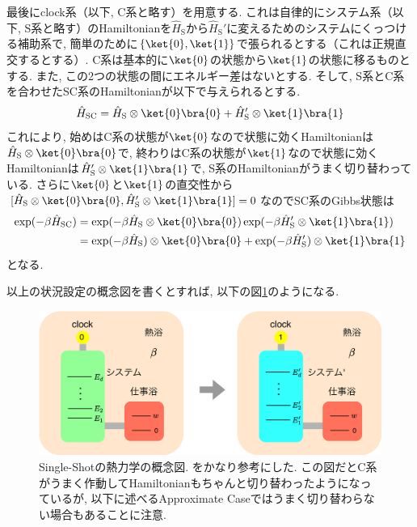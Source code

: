 最後にclock系（以下, C系と略す）を用意する. 
これは自律的にシステム系（以下, S系と略す）のHamiltonianを$\hat{H}_\text{S}$から$\hat{H}_\text{S}'$に変えるためのシステムにくっつける補助系で, 簡単のために$\{\ket{0}, \ket{1}\}$で張られるとする（これは正規直交するとする）. 
C系は基本的に$\ket{0}$の状態から$\ket{1}$の状態に移るものとする. 
また, この2つの状態の間にエネルギー差はないとする. 
そして, S系とC系を合わせたSC系のHamiltonianが以下で与えられるとする. 
\begin{equation}
  \hat{H}_{\text{SC}}=\hat{H}_{\text{S}}\otimes\ket{0}\bra{0}+\hat{H}_{\text{S}}'\otimes\ket{1}\bra{1}
\end{equation}
これにより, 始めはC系の状態が$\ket{0}$なので状態に効くHamiltonianは$\hat{H}_{\text{S}}\otimes\ket{0}\bra{0}$で, 終わりはC系の状態が$\ket{1}$なので状態に効くHamiltonianは$\hat{H}_{\text{S}}'\otimes\ket{1}\bra{1}$で, S系のHamiltonianがうまく切り替わっている. 
さらに$\ket{0}$と$\ket{1}$の直交性から$[\hat{H}_{\text{S}}\otimes\ket{0}\bra{0}, \hat{H}_{\text{S}}'\otimes\ket{1}\bra{1}]=0$なのでSC系のGibbs状態は
\begin{align}
  \exp(-\beta\hat{H}_{\text{SC}})&=\exp(-\beta\hat{H}_{\text{S}}\otimes\ket{0}\bra{0})\exp(-\beta\hat{H}_{\text{S}}'\otimes\ket{1}\bra{1})\\
  &=\exp(-\beta\hat{H}_{\text{S}})\otimes\ket{0}\bra{0}+\exp(-\beta\hat{H}_{\text{S}}')\otimes\ket{1}\bra{1}
\end{align}
となる. 

以上の状況設定の概念図を書くとすれば, 以下の図\ref{fig:Single-Shot_quantumtherm}のようになる. 

\begin{figure}[H]
  \centering
  \includegraphics[keepaspectratio, scale=0.04]{images/Single-Shot_quantumthermo.drawio.png}
  \caption{Single-Shotの熱力学の概念図. 
  \cite{PhysLabResource}をかなり参考にした. 
  この図だとC系がうまく作動してHamiltonianもちゃんと切り替わったようになっているが, 以下に述べるApproximate Caseではうまく切り替わらない場合もあることに注意. }
  \label{fig:Single-Shot_quantumtherm}
\end{figure}

